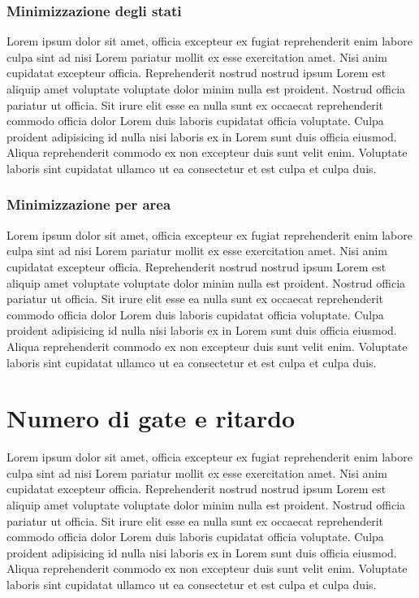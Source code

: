\documentclass[a4paper]{article}
\begin{document}
\subsubsection{Minimizzazione degli stati}
Lorem ipsum dolor sit amet, officia excepteur ex fugiat reprehenderit enim labore culpa sint ad nisi Lorem pariatur mollit ex esse exercitation amet. Nisi anim cupidatat excepteur officia. Reprehenderit nostrud nostrud ipsum Lorem est aliquip amet voluptate voluptate dolor minim nulla est proident. Nostrud officia pariatur ut officia. Sit irure elit esse ea nulla sunt ex occaecat reprehenderit commodo officia dolor Lorem duis laboris cupidatat officia voluptate. Culpa proident adipisicing id nulla nisi laboris ex in Lorem sunt duis officia eiusmod. Aliqua reprehenderit commodo ex non excepteur duis sunt velit enim. Voluptate laboris sint cupidatat ullamco ut ea consectetur et est culpa et culpa duis.

\subsubsection{Minimizzazione per area}
Lorem ipsum dolor sit amet, officia excepteur ex fugiat reprehenderit enim labore culpa sint ad nisi Lorem pariatur mollit ex esse exercitation amet. Nisi anim cupidatat excepteur officia. Reprehenderit nostrud nostrud ipsum Lorem est aliquip amet voluptate voluptate dolor minim nulla est proident. Nostrud officia pariatur ut officia. Sit irure elit esse ea nulla sunt ex occaecat reprehenderit commodo officia dolor Lorem duis laboris cupidatat officia voluptate. Culpa proident adipisicing id nulla nisi laboris ex in Lorem sunt duis officia eiusmod. Aliqua reprehenderit commodo ex non excepteur duis sunt velit enim. Voluptate laboris sint cupidatat ullamco ut ea consectetur et est culpa et culpa duis.



\section{Numero di gate e ritardo}
Lorem ipsum dolor sit amet, officia excepteur ex fugiat reprehenderit enim labore culpa sint ad nisi Lorem pariatur mollit ex esse exercitation amet. Nisi anim cupidatat excepteur officia. Reprehenderit nostrud nostrud ipsum Lorem est aliquip amet voluptate voluptate dolor minim nulla est proident. Nostrud officia pariatur ut officia. Sit irure elit esse ea nulla sunt ex occaecat reprehenderit commodo officia dolor Lorem duis laboris cupidatat officia voluptate. Culpa proident adipisicing id nulla nisi laboris ex in Lorem sunt duis officia eiusmod. Aliqua reprehenderit commodo ex non excepteur duis sunt velit enim. Voluptate laboris sint cupidatat ullamco ut ea consectetur et est culpa et culpa duis.
\end{document}
